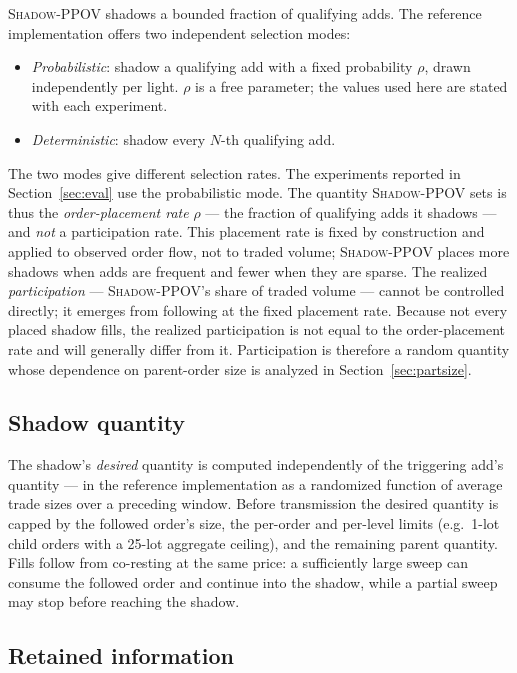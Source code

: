 \documentclass[11pt]{article}
\newcommand{\pov}{\textsc{Shadow-PPOV}}
\begin{document}
\pov{} shadows a bounded fraction of qualifying adds. The reference
implementation offers two independent selection modes:
\begin{itemize}[leftmargin=1.4em]
  \item \emph{Probabilistic}: shadow a qualifying add with a fixed probability
  $\rho$, drawn independently per light. $\rho$ is a free parameter; the values
  used here are stated with each experiment.
  \item \emph{Deterministic}: shadow every $N$-th qualifying add.
\end{itemize}
The two modes give different selection rates. The experiments reported in
Section~\ref{sec:eval} use the probabilistic mode.
The quantity \pov{} sets is thus the \emph{order-placement rate} $\rho$ --- the
fraction of qualifying adds it shadows --- and \emph{not} a participation rate.
This placement rate is fixed by construction and applied to observed order flow,
not to traded volume; \pov{} places more shadows when adds are frequent and
fewer when they are sparse. The realized \emph{participation} --- \pov{}'s share
of traded volume --- cannot be controlled directly; it emerges from following at
the fixed placement rate. Because not every placed shadow fills, the realized
participation is not equal to the order-placement rate and will generally differ
from it.
Participation is therefore a random quantity whose dependence on parent-order
size is analyzed in Section~\ref{sec:partsize}.

\subsection{Shadow quantity}

The shadow's \emph{desired} quantity is computed independently of the triggering
add's quantity --- in the reference implementation as a randomized function of
average trade sizes over a preceding window. Before transmission the desired
quantity is capped by the followed order's size, the per-order and per-level
limits (e.g.\ 1-lot child orders with a 25-lot aggregate ceiling), and the
remaining parent quantity. Fills
follow from co-resting at the same price: a sufficiently large sweep can consume
the followed order and continue into the shadow, while a partial sweep may stop
before reaching the shadow.

\subsection{Retained information}
\label{sec:map}
\end{document}
